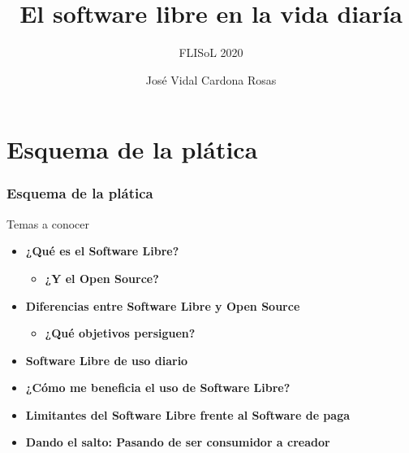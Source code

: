 \documentclass{beamer}
\title{El software libre en la vida diaría}
\subtitle{FLISoL 2020}
\author{José Vidal Cardona Rosas}
\institute{ENES, Morelia Mich.}
\begin{document}
    \begin{frame}
        \titlepage
    \end{frame}

    \section{Esquema de la plática}
    \begin{frame}
        \frametitle{Esquema de la plática}
        \begin{block}{Temas a conocer}
            \begin{itemize}
                \item \textbf{¿Qué es el Software Libre?}
                \begin{itemize}
                    \item \textbf{¿Y el Open Source?}
                \end{itemize}
                \item \textbf{Diferencias entre Software Libre 
                y Open Source}
                \begin{itemize}
                    \item \textbf{¿Qué objetivos persiguen?}
                \end{itemize}
                \item \textbf{Software Libre de uso diario}
                \item \textbf{¿Cómo me beneficia el uso de
                Software Libre?}
                \item \textbf{Limitantes del Software Libre
                frente al Software de paga}
                \item \textbf{Dando el salto: Pasando de ser
                consumidor a creador}
            \end{itemize}
        \end{block}
    \end{frame}

\end{document}
